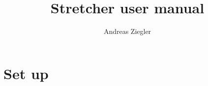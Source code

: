 \documentclass[a4paper]{memoir}
\title{Stretcher user manual}
\author{Andreas Ziegler}
\begin{document}
\begin{titlingpage}
\maketitle
\end{titlingpage}

\tableofcontents
\newpage

\chapter{Set up}
\label{chapter:setup}








\end{document}
